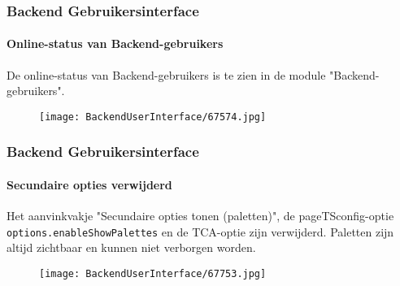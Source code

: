 \begin{frame}[fragile]
	\frametitle{Backend Gebruikersinterface}
	\framesubtitle{Online-status van Backend-gebruikers}

	De online-status van Backend-gebruikers is te zien in de module "Backend-gebruikers".

	\begin{figure}
		\texttt{[image: BackendUserInterface/67574.jpg]}
	\end{figure}

\end{frame}

\begin{frame}[fragile]
	\frametitle{Backend Gebruikersinterface}
	\framesubtitle{Secundaire opties verwijderd}

	Het aanvinkvakje "Secundaire opties tonen (paletten)", de pageTSconfig-optie \texttt{options.enableShowPalettes}
	en de TCA-optie zijn verwijderd. Paletten zijn altijd zichtbaar en kunnen niet verborgen worden.

	\begin{figure}
		\texttt{[image: BackendUserInterface/67753.jpg]}
	\end{figure}

\end{frame}

